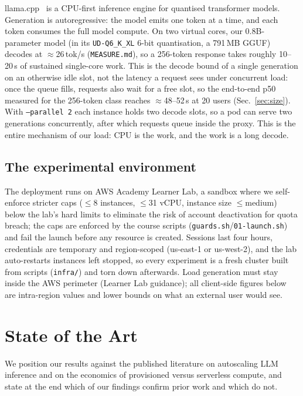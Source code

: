 \documentclass[conference]{IEEEtran}
\newcommand{\code}[1]{\texttt{#1}}
\begin{document}
llama.cpp~\cite{llamacpp} is a CPU-first inference engine for quantised
transformer models.
Generation is autoregressive: the model emits one token at a time, and each
token consumes the full model compute. On two virtual cores, our 0.8B-parameter
model (in its \code{UD-Q6\_K\_XL} 6-bit quantisation, a 791\,MB GGUF) decodes
at $\approx$26\,tok/s (\code{MEASURE.md}), so a 256-token response takes roughly 10--20\,s of
sustained single-core work. This is the decode bound of a single generation
on an otherwise idle slot, not the latency a request sees under concurrent
load: once the queue fills, requests also wait for a free slot, so the
end-to-end p50 measured for the 256-token class reaches $\approx$48--52\,s at
20 users (Sec.~\ref{sec:size}). With \code{--parallel 2} each instance holds two
decode slots, so a pod can serve two generations concurrently, after which
requests queue inside the proxy. This is the entire mechanism of our load: CPU
is the work, and the work is a long decode.

\subsection{The experimental environment}

The deployment runs on AWS Academy Learner Lab, a sandbox where we
self-enforce stricter caps ($\le$8 instances, $\le$31 vCPU, instance size
$\le$medium) below the lab's hard limits to eliminate the risk of account
deactivation for quota breach; the caps are enforced by the course scripts
(\code{guards.sh}/\code{01-launch.sh}) and fail the launch before any
resource is created. Sessions last four hours, credentials are temporary and
region-scoped (us-east-1 or us-west-2), and the lab auto-restarts instances
left stopped, so every experiment is a fresh cluster built from scripts
(\code{infra/}) and torn down afterwards. Load generation must stay inside
the AWS perimeter (Learner Lab guidance); all client-side figures below are
intra-region values and lower bounds on what an external user would see.

\section{State of the Art}
\label{sec:sota}

We position our results against the published literature on autoscaling LLM
inference and on the economics of provisioned versus serverless compute, and
state at the end which of our findings confirm prior work and which do not.
\end{document}
